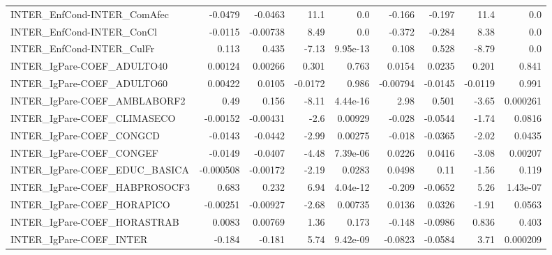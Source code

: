 \begin{tabular}{lrrrrrrrr}
INTER\_EnfCond-INTER\_ComAfec            &     -0.0479 &      -0.0463 &     11.1 &      0.0 &     -0.166 &      -0.197 &         11.4 &           0.0 \\
INTER\_EnfCond-INTER\_ConCl              &     -0.0115 &     -0.00738 &     8.49 &      0.0 &     -0.372 &      -0.284 &         8.38 &           0.0 \\
INTER\_EnfCond-INTER\_CulFr              &       0.113 &        0.435 &    -7.13 & 9.95e-13 &      0.108 &       0.528 &        -8.79 &           0.0 \\
INTER\_IgPare-COEF\_ADULTO40             &     0.00124 &      0.00266 &    0.301 &    0.763 &     0.0154 &      0.0235 &        0.201 &         0.841 \\
INTER\_IgPare-COEF\_ADULTO60             &     0.00422 &       0.0105 &  -0.0172 &    0.986 &   -0.00794 &     -0.0145 &      -0.0119 &         0.991 \\
INTER\_IgPare-COEF\_AMBLABORF2           &        0.49 &        0.156 &    -8.11 & 4.44e-16 &       2.98 &       0.501 &        -3.65 &      0.000261 \\
INTER\_IgPare-COEF\_CLIMASECO            &    -0.00152 &     -0.00431 &     -2.6 &  0.00929 &     -0.028 &     -0.0544 &        -1.74 &        0.0816 \\
INTER\_IgPare-COEF\_CONGCD               &     -0.0143 &      -0.0442 &    -2.99 &  0.00275 &     -0.018 &     -0.0365 &        -2.02 &        0.0435 \\
INTER\_IgPare-COEF\_CONGEF               &     -0.0149 &      -0.0407 &    -4.48 & 7.39e-06 &     0.0226 &      0.0416 &        -3.08 &       0.00207 \\
INTER\_IgPare-COEF\_EDUC\_BASICA          &   -0.000508 &     -0.00172 &    -2.19 &   0.0283 &     0.0498 &        0.11 &        -1.56 &         0.119 \\
INTER\_IgPare-COEF\_HABPROSOCF3          &       0.683 &        0.232 &     6.94 & 4.04e-12 &     -0.209 &     -0.0652 &         5.26 &      1.43e-07 \\
INTER\_IgPare-COEF\_HORAPICO             &    -0.00251 &     -0.00927 &    -2.68 &  0.00735 &     0.0136 &      0.0326 &        -1.91 &        0.0563 \\
INTER\_IgPare-COEF\_HORASTRAB            &      0.0083 &      0.00769 &     1.36 &    0.173 &     -0.148 &     -0.0986 &        0.836 &         0.403 \\
INTER\_IgPare-COEF\_INTER                &      -0.184 &       -0.181 &     5.74 & 9.42e-09 &    -0.0823 &     -0.0584 &         3.71 &      0.000209 \\

\end{tabular}
